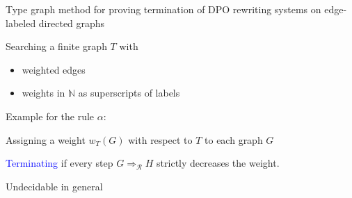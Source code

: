 \documentclass{beamer}
\newcommand{\graphbox}[8]{
  \begin{scope}[xshift=#2,yshift=#3]
    \draw [rounded corners=2mm] (0,0) rectangle (#4,-#5);
    \node at (0,0mm) [anchor=north west,inner sep=1mm] {#1};
    \begin{scope}[xshift=#4/2+#6,yshift=#7] 
    #8
    \end{scope}
  \end{scope}
}
\begin{document}

\begin{frame}{Type graph method for proving termination of DPO rewriting systems on edge-labeled directed graphs}

    Searching a finite graph \( T \) with 
      \begin{itemize}
        \item weighted edges
        \item weights in $\mathbb{N}$ as superscripts of labels
      \end{itemize} 

    Example for the rule $\alpha$:
    \begin{center}
    \end{center}
    
    Assigning a weight $w_T(G)$ with respect to $T$ to each graph $G$

    \textcolor{blue}{Terminating} if every step $G \Rightarrow_\mathcal{R} H$ strictly decreases the weight.

    Undecidable in general

\end{frame}
\end{document}
